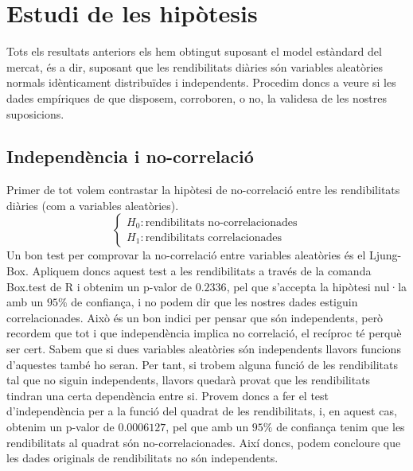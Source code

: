 \documentclass{article}
\numberwithin{table}{section}
\numberwithin{figure}{section}
\numberwithin{equation}{section}
\begin{document}
\section{Estudi de les hipòtesis}
Tots els resultats anteriors els hem obtingut suposant el model estàndard del mercat, és a dir, suposant que les rendibilitats diàries són variables aleatòries normals idènticament distribuïdes i independents. Procedim doncs a veure si les dades empíriques de que disposem, corroboren, o no, la validesa de les nostres suposicions.

\subsection{Independència i no-correlació}%
Primer de tot volem contrastar la hipòtesi de no-correlació entre les rendibilitats diàries (com a variables aleatòries).
\begin{equation}
  \begin{cases}
    H_0: \text{rendibilitats no-correlacionades}\\
    H_1: \text{rendibilitats correlacionades}
  \end{cases}
\end{equation}
Un bon test per comprovar la no-correlació entre variables aleatòries és el Ljung-Box. Apliquem doncs aquest test a les rendibilitats a través de la comanda Box.test de R i obtenim un p-valor de $0.2336$, pel que s'accepta la hipòtesi nul·la amb un $95\%$ de confiança, i no podem dir que les nostres dades estiguin correlacionades. Això és un bon indici per pensar que són independents, però recordem que tot i que independència implica no correlació, el recíproc té perquè ser cert. Sabem que si dues variables aleatòries són independents llavors funcions d’aquestes també ho seran. Per tant, si trobem alguna funció de les rendibilitats tal que no siguin independents, llavors quedarà provat que les rendibilitats tindran una certa dependència entre si.  Provem doncs a fer el test d’independència per a la funció del quadrat de les rendibilitats, i, en aquest cas, obtenim un p-valor de $0.0006127$, pel que amb un $95\%$ de confiança tenim que les rendibilitats al quadrat són no-correlacionades. Així doncs, podem concloure que les dades originals de rendibilitats no són independents. 
\end{document}
